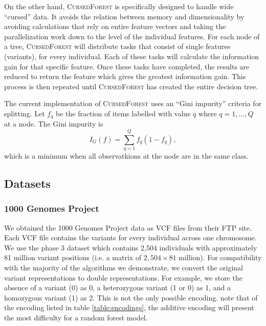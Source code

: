 \documentclass[10pt,letterpaper]{article}
\newcommand{\cursedforest}{\textsc{CursedForest}\xspace}
\begin{document}
On the other hand, \cursedforest is specifically designed to handle wide ``cursed'' data. It avoids the relation between
memory and dimensionality by avoiding calculations that rely on entire feature vectors and taking the parallelization
work down to the level of the individual features.  For each node of a tree, \cursedforest will distribute
tasks that consist of single features (variants), for every individual.  Each of these tasks will calculate the
information gain for that specific feature.  Once these tasks have completed, the results are reduced to return the
feature which gives the greatest information gain.  This process is then repeated until \cursedforest has created the
entire decision tree.

The current implementation of \cursedforest uses an ``Gini impurity'' criteria for splitting. Let $f_q$ be the fraction
of items labelled with value $q$ where $q = 1, \ldots, Q$ at a node. The Gini impurity is
$$
I_G(f) = \sum_{q = 1}^Q f_q ( 1 - f_q ), 
$$
which is a minimum when all observatkions at the node are in the same class.

\subsection{Datasets}
\subsubsection{1000 Genomes Project}
We obtained the 1000 Genomes Project data as VCF files from their FTP site.  Each VCF file contains the variants for
every individual across one chromosome.  We use the phase 3 dataset which contains 2,504 individuals with approximately
81 million variant positions (i.e. a matrix of $2,504 \times 81$ million).  For compatibility with the majority of the
algorithms we demonstrate, we convert the original variant representations to double representations.  For example, we
store the absence of a variant (0) as 0, a heterozygous
variant (1 or 0) as 1, and a
homozygous variant (1) as 2.  This is not the only possible encoding.  \cite{Goldstein.et.al.2011} note that of
the encoding listed in table \ref{table:encodings}, the additive encoding will present the most difficulty for a random
forest model.
\end{document}
